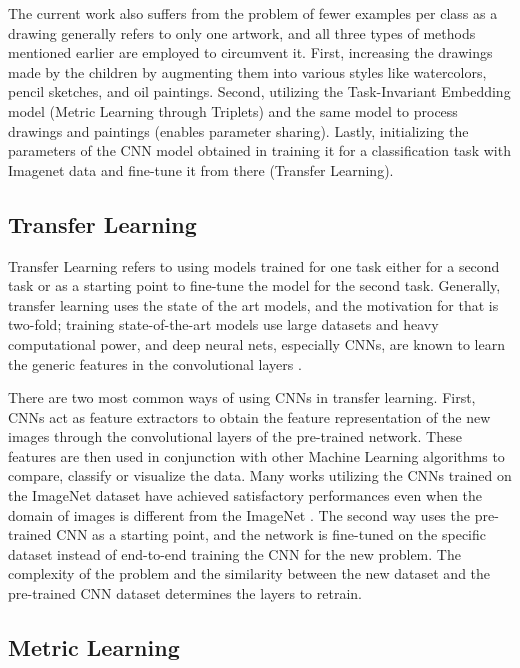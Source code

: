 The current work also suffers from the problem of fewer examples per class as a drawing generally refers to only one artwork, and all three types of methods mentioned earlier are employed to circumvent it. First, increasing the drawings made by the children by augmenting them into various styles like watercolors, pencil sketches, and oil paintings. Second, utilizing the Task-Invariant Embedding model (Metric Learning through Triplets) and the same model to process drawings and paintings (enables parameter sharing). Lastly, initializing the parameters of the CNN model obtained in training it for a classification task with Imagenet data \cite{deng2009imagenet} and fine-tune it from there (Transfer Learning).

\subsection{Transfer Learning}

Transfer Learning refers to using models trained for one task either for a second task or as a starting point to fine-tune the model for the second task. Generally, transfer learning uses the state of the art models, and the motivation for that is two-fold; training state-of-the-art models use large datasets and heavy computational power, and deep neural nets, especially CNNs, are known to learn the generic features in the convolutional layers \cite{zeiler2014visualizing}. 

There are two most common ways of using CNNs in transfer learning. First, CNNs act as feature extractors to obtain the feature representation of the new images through the convolutional layers of the pre-trained network. These features are then used in conjunction with other Machine Learning algorithms to compare, classify or visualize the data. Many works utilizing the CNNs trained on the ImageNet dataset \cite{deng2009imagenet} have achieved satisfactory performances even when the domain of images is different from the ImageNet \cite{long2015fully, shin2016deep, Schroff2015FaceNetAU}. The second way uses the pre-trained CNN as a starting point, and the network is fine-tuned on the specific dataset instead of end-to-end training the CNN for the new problem. The complexity of the problem and the similarity between the new dataset and the pre-trained CNN dataset determines the layers to retrain.


\subsection{Metric Learning}\label{chap:2:metric-learn}

